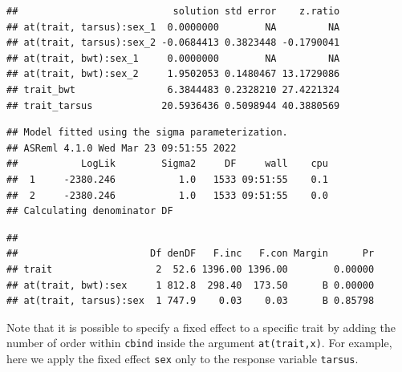 \documentclass[
  12pt,
]{book}
\begin{document}
\begin{verbatim}
##                           solution std error    z.ratio
## at(trait, tarsus):sex_1  0.0000000        NA         NA
## at(trait, tarsus):sex_2 -0.0684413 0.3823448 -0.1790041
## at(trait, bwt):sex_1     0.0000000        NA         NA
## at(trait, bwt):sex_2     1.9502053 0.1480467 13.1729086
## trait_bwt                6.3844483 0.2328210 27.4221324
## trait_tarsus            20.5936436 0.5098944 40.3880569
\end{verbatim}

\begin{verbatim}
## Model fitted using the sigma parameterization.
## ASReml 4.1.0 Wed Mar 23 09:51:55 2022
##           LogLik        Sigma2     DF     wall    cpu
##  1     -2380.246           1.0   1533 09:51:55    0.1
##  2     -2380.246           1.0   1533 09:51:55    0.0
## Calculating denominator DF
\end{verbatim}

\begin{verbatim}
## 
##                       Df denDF   F.inc   F.con Margin      Pr
## trait                  2  52.6 1396.00 1396.00        0.00000
## at(trait, bwt):sex     1 812.8  298.40  173.50      B 0.00000
## at(trait, tarsus):sex  1 747.9    0.03    0.03      B 0.85798
\end{verbatim}

Note that it is possible to specify a fixed effect to a specific trait by adding the number of order within \texttt{cbind} inside the argument \texttt{at(trait,x)}. For example, here we apply the fixed effect \texttt{sex} only to the response variable \texttt{tarsus}.
\end{document}
